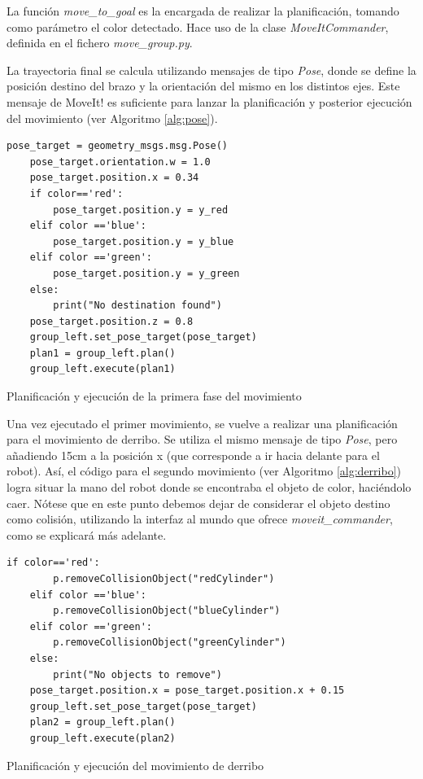 \documentclass[12pt,spanish,chapterprefix, numbers=noenddot]{book}
\numberwithin{equation}{section}
\numberwithin{figure}{section}
\begin{document}
La función \textit{move\_to\_goal} es la encargada de realizar la planificación, tomando como parámetro el color detectado.
Hace uso de la clase \textit{MoveItCommander}, definida en el fichero \textit{move\_group.py}.  
	
La trayectoria final se calcula utilizando mensajes de tipo \textit{Pose}, donde se define la posición destino del brazo y la orientación del mismo en los distintos ejes. Este mensaje de MoveIt! es suficiente para lanzar la planificación y posterior ejecución del movimiento (ver Algoritmo \ref{alg:pose}).

\begin{algorithm}[htb!]
    \begin{lstlisting}[frame=single] 
    pose_target = geometry_msgs.msg.Pose()
    pose_target.orientation.w = 1.0
    pose_target.position.x = 0.34 
    if color=='red':
        pose_target.position.y = y_red
    elif color =='blue':
        pose_target.position.y = y_blue
    elif color =='green':
        pose_target.position.y = y_green
    else:
        print("No destination found")
    pose_target.position.z = 0.8 
    group_left.set_pose_target(pose_target)
    plan1 = group_left.plan()
    group_left.execute(plan1)
    \end{lstlisting}
\caption{\label{alg:pose}Planificación y ejecución de la primera fase del movimiento}
\end{algorithm}

Una vez ejecutado el primer movimiento, se vuelve a realizar una planificación para el movimiento de derribo. Se utiliza el mismo mensaje de tipo \textit{Pose}, pero añadiendo 15cm a la posición x (que corresponde a ir hacia delante para el robot). Así, el código para el segundo movimiento (ver Algoritmo \ref{alg:derribo}) logra situar la mano del robot donde se encontraba el objeto de color, haciéndolo caer. Nótese que en este punto debemos dejar de considerar el objeto destino como colisión, utilizando la interfaz al mundo que ofrece \textit{moveit\_commander}, como se explicará más adelante. 

\begin{algorithm}[htb!]
    \begin{lstlisting}[frame=single] 
    if color=='red':
        p.removeCollisionObject("redCylinder")
    elif color =='blue':
        p.removeCollisionObject("blueCylinder")
    elif color =='green':
        p.removeCollisionObject("greenCylinder")
    else:
        print("No objects to remove")
    pose_target.position.x = pose_target.position.x + 0.15
    group_left.set_pose_target(pose_target)
    plan2 = group_left.plan()
    group_left.execute(plan2)
    \end{lstlisting}
\caption{\label{alg:derribo}Planificación y ejecución del movimiento de derribo}
\end{algorithm}
	
\end{document}
